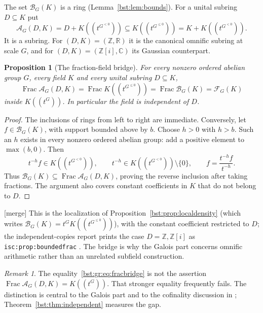 \documentclass[11pt,letterpaper]{article}
\newtheorem{proposition}[theorem]{Proposition}
\theoremstyle{definition}
\theoremstyle{remark}
\newtheorem{remark}[theorem]{Remark}
\newcommand{\R}{\mathbb R}
\newcommand{\C}{\mathbb C}
\newcommand{\Z}{\mathbb Z}
\newcommand{\Frac}{\operatorname{Frac}}
\newcommand{\HH}[2]{#1((t^{#2}))}
\newcommand{\BB}[2]{\mathcal B_{#2}(#1)}
\newcommand{\FF}[2]{\mathcal F_{#2}(#1)}
\newcommand{\AAG}[3]{\mathcal A_{#3}(#1,#2)}
\begin{document}
The set $\BB KG$ is a ring (Lemma~\ref{bst:lem:bounds}). For a unital subring
$D\subseteq K$ put
\[
 \AAG DKG=D+K((t^{G^{<0}}))\subseteq K((t^{G^{\le0}}))=K+K((t^{G^{<0}})).
\]
It is a subring. For $(D,K)=(\Z,\R)$ it is the canonical omnific subring at
scale $G$, and for $(D,K)=(\Z[i],\C)$ its Gaussian counterpart.

\begin{proposition}[The fraction-field bridge]\label{bst:gr:prop:fractions}
For every nonzero ordered abelian group $G$, every field $K$ and every
unital subring $D\subseteq K$,
\begin{equation}\label{bst:gr:eq:fracbridge}
 \Frac\AAG DKG=\Frac K((t^{G^{\le0}}))=\Frac\BB KG=\FF KG
\end{equation}
inside $\HH KG$. In particular the field is independent of $D$.
\end{proposition}
\begin{proof}
The inclusions of rings from left to right are immediate. Conversely,
let $f\in\BB KG$, with support bounded above by $b$. Choose $h>0$ with
$h>b$. Such an $h$ exists in every nonzero ordered abelian group: add a
positive element to $\max(b,0)$. Then
\[
 t^{-h}f\in K((t^{G^{<0}})),\qquad
 t^{-h}\in K((t^{G^{<0}}))\setminus\{0\},\qquad
 f=\frac{t^{-h}f}{t^{-h}}.
\]
Thus $\BB KG\subseteq\Frac\AAG DKG$, proving the reverse inclusion after
taking fractions. The argument also covers constant coefficients in $K$ that
do not belong to $D$.
\end{proof}

\textup{[merge]} This is the localization of
Proposition~\ref{bst:prop:localdensity} (which writes
$\BB KG=t^GK((t^{G^{\le0}}))$), with the constant coefficient restricted to
$D$; the independent-copies report prints the case $D=\Z,\Z[i]$ as
\texttt{isc:prop:boundedfrac} \cite{RepoIsc}. The bridge is why the Galois
part concerns omnific arithmetic rather than an unrelated subfield
construction.

\begin{remark}\label{bst:gr:rem:notwhole}
The equality~\eqref{bst:gr:eq:fracbridge} is not the assertion
$\Frac\AAG DKG=\HH KG$. That stronger equality frequently fails. The
distinction is central to the Galois part and to the cofinality discussion
in \cite[Proposition~2.4.5]{LM24}; Theorem~\ref{bst:thm:independent} measures
the gap.
\end{remark}
\end{document}
